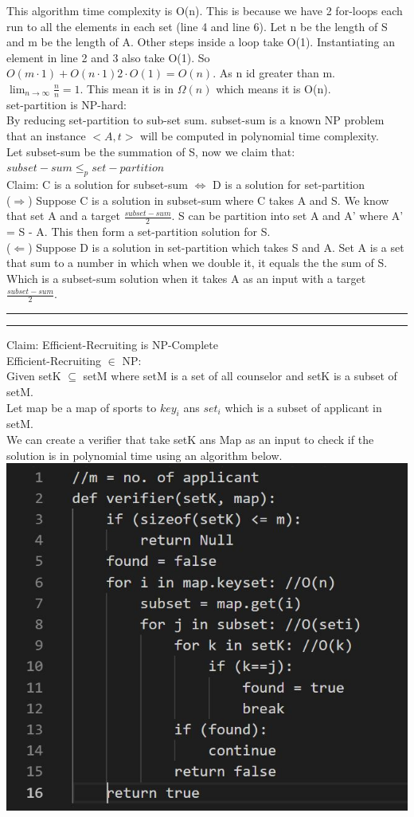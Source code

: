 \documentclass[a4paper, 11pt]{article}
\newcommand{\question}[2] {\vspace{.25in} \hrule\vspace{0.5em}
\noindent{\bf #1: #2} \vspace{0.5em}
\hrule \vspace{.10in}}
\begin{document}
This algorithm time complexity is O(n). This is because we have 2 for-loops each run to all the elements in each set (line 4 and line 6). Let n be the length of S and m be the length of A. Other steps inside a loop take O(1). Instantiating an element in line 2 and 3 also take O(1). So $O(m \cdot 1) + O(n\cdot 1) 2 \cdot O(1) = O(n)$. As n id greater than m. $\lim_{n \to \infty} \frac{n}{n} = 1$. This mean it is in $\Omega(n)$ which means it is O(n).\\
set-partition is NP-hard:\\
By reducing set-partition to sub-set sum. subset-sum is a known NP problem that an instance $<A,t>$ will be computed in polynomial time complexity.\\
Let subset-sum be the summation of S, now we claim that:\\
$subset-sum \leq_{p} set-partition$\\
Claim: C is a solution for subset-sum $\iff $  D is a solution for set-partition\\
($\Rightarrow$) Suppose C is a solution in subset-sum where C takes A and S. We know that set A and a target $\frac{subset-sum}{2}$. S can be partition into set A and A' where A' = S - A. This then form a set-partition solution for S.\\
($\Leftarrow$) Suppose D is a solution in set-partition which takes S and A. Set A is a set that sum to a number in which when we double it, it equals the the sum of S. Which is a subset-sum solution when it takes A as an input with a target $\frac{subset-sum}{2}$.
\question{3}{Problem3}
Claim: Efficient-Recruiting is NP-Complete\\
Efficient-Recruiting $\in$ NP:\\
Given setK $\subseteq$ setM where setM is a set of all counselor and setK is a subset of setM.\\
Let map be a map of sports to $key_{i}$ ans $set_{i}$ which is a subset of applicant in setM.\\
We can create a verifier that take setK ans Map as an input to check if the solution is in polynomial time using an algorithm below.\\
\includegraphics[width=\textwidth]{q3.jpg}\\
\end{document}
